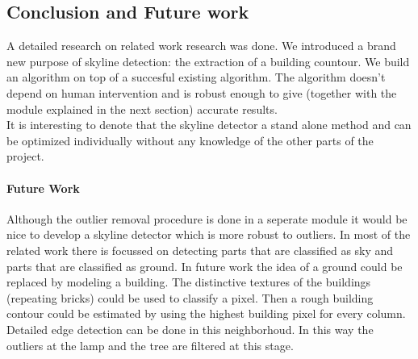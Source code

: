 
\subsection{Conclusion and Future work}
A detailed research on related work research was done.
We introduced a brand new purpose of skyline detection: the extraction of a
building countour. We build an algorithm on top of a succesful existing
algorithm.  The algorithm doesn't depend on human intervention and is robust enough to give
(together with the module explained in the next section) accurate results.\\
It is interesting to denote that the skyline detector a stand alone method and
can be optimized individually without any knowledge of the other parts of the
project.

\paragraph{Future Work}
Although the outlier removal procedure is done in a seperate module it would be
nice to develop a skyline detector which is more robust to outliers.
In most of the related work there is focussed on detecting parts that are
classified as sky and parts that are classified as ground. In future work the
idea of a ground could be replaced by modeling a building. The distinctive
textures of the buildings (repeating bricks) could be used to classify a
pixel. Then a rough building contour could be estimated by using the
highest building pixel for every column. Detailed edge detection can be
done in this neighborhoud. In this way the outliers at the lamp and the tree are
filtered at this stage.




%




